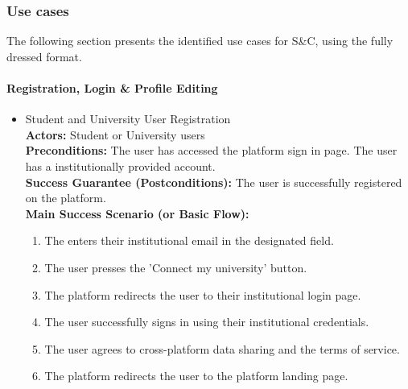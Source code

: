 \subsubsection{Use cases}
The following section presents the identified use cases for S\&C, using the fully dressed format.

\paragraph{Registration, Login \& Profile Editing}

\begin{itemize}[label={[\textbf{UC}]}, align=left, leftmargin=*]
     \item {} Student and University User Registration\\
     \textbf{Actors:} Student or University users\\
     \textbf{Preconditions:} The user has accessed the platform sign in page. The user has a institutionally provided account.\\
     \textbf{Success Guarantee (Postconditions):} The user is successfully registered on the platform.\\
     \textbf{Main Success Scenario (or Basic Flow):} 
     \begin{enumerate}[label=\arabic*.] 
        \item The enters their institutional email in the designated field.
        \item The user presses the 'Connect my university' button.
        \item The platform redirects the user to their institutional login page.
        \item The user successfully signs in using their institutional credentials.
        \item The user agrees to cross-platform data sharing and the terms of service.
        \item The platform redirects the user to the platform landing page.
     \end{enumerate} \\


\end{itemize}
